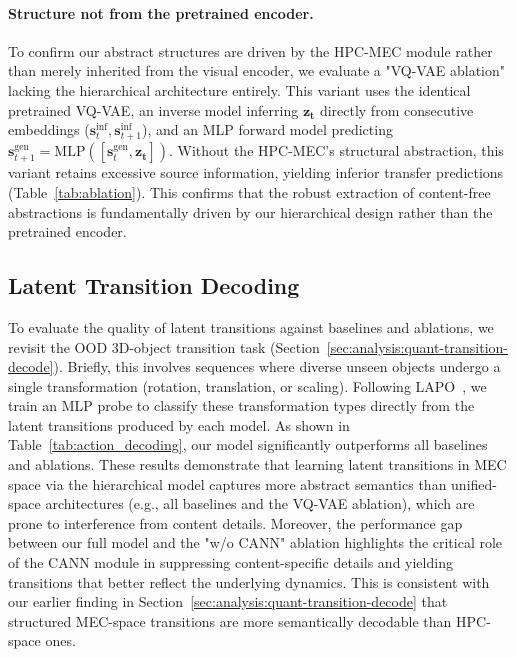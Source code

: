 \vspace{-0.2cm}
\paragraph{Structure not from the pretrained encoder.}
To confirm our abstract structures are driven by the HPC-MEC module rather than merely inherited from the visual encoder, we evaluate a "VQ-VAE ablation" lacking the hierarchical architecture entirely. This variant uses the identical pretrained VQ-VAE, an inverse model inferring $\boldsymbol{z_t}$ directly from consecutive embeddings ($\boldsymbol{s}_t^{\text{inf}}, \boldsymbol{s}_{t+1}^{\text{inf}}$), and an MLP forward model predicting $\boldsymbol{s}_{t+1}^{\text{gen}} = \text{MLP}([\boldsymbol{s}_t^{\text{gen}}, \boldsymbol{z_t}])$. Without the HPC-MEC's structural abstraction, this variant retains excessive source information, yielding inferior transfer predictions (Table~\ref{tab:ablation}). This confirms that the robust extraction of content-free abstractions is fundamentally driven by our hierarchical design rather than the pretrained encoder.

\subsection{Latent Transition Decoding}
To evaluate the quality of latent transitions against baselines and ablations, we revisit the OOD 3D-object transition task (Section~\ref{sec:analysis:quant-transition-decode}). Briefly, this involves sequences where diverse unseen objects undergo a single transformation (rotation, translation, or scaling). Following LAPO~\citep{lapo}, we train an MLP probe to classify these transformation types directly from the latent transitions produced by each model. 
As shown in Table~\ref{tab:action_decoding}, our model significantly outperforms all baselines and ablations. These results demonstrate that learning latent transitions in MEC space via the hierarchical model captures more abstract semantics than unified-space architectures (e.g., all baselines and the VQ-VAE ablation),  which are prone to interference from content details. Moreover, the performance gap between our full model and the "w/o CANN" ablation highlights the critical role of the CANN module in suppressing content-specific details and yielding transitions that better reflect the underlying dynamics. This is consistent with our earlier finding in Section~\ref{sec:analysis:quant-transition-decode} that structured MEC-space transitions are more semantically decodable than HPC-space ones.

